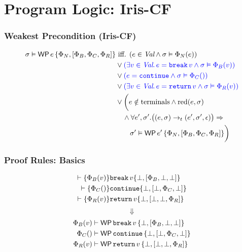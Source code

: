 \documentclass[10pt]{beamer}
\newcommand{\blue}[1]{{\color[rgb]{0, 0, 1} #1}}
\begin{document}
\section{Program Logic: Iris-CF}

\begin{frame}
\frametitle{Weakest Precondition (Iris-CF)}

$$
\begin{aligned}
    \sigma \vDash \wpre{e}{\Phi_N}{\Phi_B}{\Phi_C}{\Phi_R} &\text{ iff. }
           (e \in \textit{Val} \land \sigma \vDash \Phi_N(e)) \\
    & \lor \blue{(\exists v \in \textit{Val}.\, e = \cmdbreak v \land \sigma \vDash \Phi_B(v))} \\
    & \lor \blue{(e = \cmdcontinue \land \sigma \vDash \Phi_C())} \\
    & \lor \blue{(\exists v \in \textit{Val}.\, e = \cmdreturn v \land \sigma \vDash \Phi_R(v))} \\
    & \lor \biggl(e \notin \text{terminals} \land \cred(e, \sigma) \\
    & \quad \land \forall e', \sigma'. \bigl((e, \sigma) \tred (e', \sigma', \epsilon)\bigr) \Rightarrow \\
    & \quad\quad \sigma' \vDash \wpre{e'}{\Phi_N}{\Phi_B}{\Phi_C}{\Phi_R} \biggr)
\end{aligned}
$$

\end{frame}

\begin{frame}
\frametitle{Proof Rules: Basics}

$$
  \begin{aligned}
      \vdash \{  \Phi_B(v)  \} &\texttt{break}\, v \{  {\bot},[{\Phi_B},{\bot},{\bot}]  \} \\
      \vdash \{  \Phi_C()  \} &\texttt{continue} \{  {\bot},[{\bot},{\Phi_C},{\bot}]  \} \\
      \vdash \{  \Phi_R(v)  \} &\texttt{return}\, v \{  {\bot},[{\bot},{\bot},{\Phi_R}]  \}
  \end{aligned}
$$
$$
\Downarrow
$$
$$
  \begin{aligned}
    \Phi_B(v) &\vdash \textsf{WP}\, \texttt{break}\, v\, \{ \bot, [\Phi_B, \bot, \bot] \} \\
    \Phi_C() &\vdash \textsf{WP}\, \texttt{continue}\, \{ \bot, [\bot, \Phi_C, \bot] \} \\
    \Phi_R(v) &\vdash \textsf{WP}\, \texttt{return}\, v\, \{ \bot, [\bot, \bot, \Phi_R] \}
  \end{aligned}
$$

\end{frame}
\end{document}
